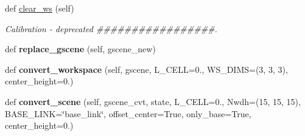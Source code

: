 \begin{DoxyCompactItemize}
\item 
\mbox{\label{classrnb-planning_1_1src_1_1pkg_1_1tmp__framework_1_1_t_m_p_framework_a3ad21e5c430d545bdbe2d6f1e5c1c3d0}} 
def \hyperlink{classrnb-planning_1_1src_1_1pkg_1_1tmp__framework_1_1_t_m_p_framework_a3ad21e5c430d545bdbe2d6f1e5c1c3d0}{clear\+\_\+ws} (self)
\begin{DoxyCompactList}\small\item\em Calibration -\/ deprecated \#\#\#\#\#\#\#\#\#\#\#\#\#\#\#\#\#. \end{DoxyCompactList}\item 
\mbox{\label{classrnb-planning_1_1src_1_1pkg_1_1tmp__framework_1_1_t_m_p_framework_a6fcad729d4844f64774c873a5162a41f}} 
def {\bfseries replace\+\_\+gscene} (self, gscene\+\_\+new)
\item 
\mbox{\label{classrnb-planning_1_1src_1_1pkg_1_1tmp__framework_1_1_t_m_p_framework_a71e600c5c84dc63a7b8dd7abe5e27015}} 
def {\bfseries convert\+\_\+workspace} (self, gscene, L\+\_\+\+C\+E\+LL=0., W\+S\+\_\+\+D\+I\+MS=(3, 3, 3), center\+\_\+height=0.)
\item 
\mbox{\label{classrnb-planning_1_1src_1_1pkg_1_1tmp__framework_1_1_t_m_p_framework_a936e2653e6974f823d0fc4b518254719}} 
def {\bfseries convert\+\_\+scene} (self, gscene\+\_\+cvt, state, L\+\_\+\+C\+E\+LL=0., Nwdh=(15, 15, 15), B\+A\+S\+E\+\_\+\+L\+I\+NK=\char`\"{}base\+\_\+link\char`\"{}, offset\+\_\+center=True, only\+\_\+base=True, center\+\_\+height=0.)
\end{DoxyCompactItemize}
